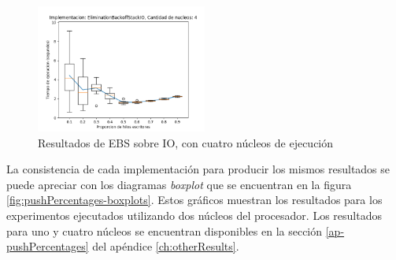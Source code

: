 \begin{figure}[H]
    \centering
    \includegraphics[width=0.5\textwidth]{images/pushPercentages/plots/expEBSIO-4.png}
    \caption{Resultados de EBS sobre IO, con cuatro núcleos de ejecución}
    \label{fig:pushPercentages-ebsio-4}
\end{figure}

La consistencia de cada implementación para producir los mismos resultados se puede apreciar con los diagramas \emph{boxplot} que se encuentran en la figura \ref{fig:pushPercentages-boxplots}. Estos gráficos muestran los resultados para los experimentos ejecutados utilizando dos núcleos del procesador. Los resultados para uno y cuatro núcleos se encuentran disponibles en la sección \ref{ap-pushPercentages} del apéndice \ref{ch:otherResults}.

